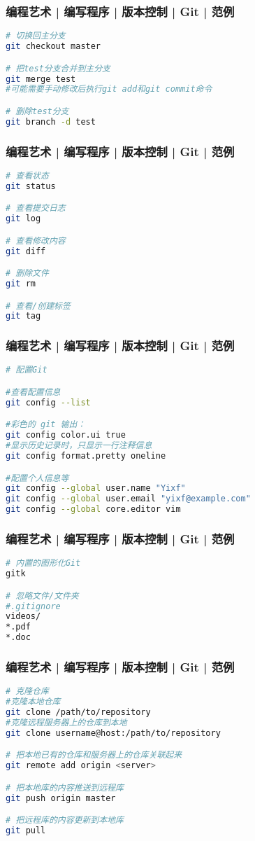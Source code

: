 \begin{frame}[fragile]
  \frametitle{编程艺术 | 编写程序 | 版本控制 | Git | 范例}
\begin{lstlisting}[language=sh]
# 切换回主分支
git checkout master

# 把test分支合并到主分支
git merge test
#可能需要手动修改后执行git add和git commit命令

# 删除test分支
git branch -d test
\end{lstlisting}
\end{frame}

\begin{frame}[fragile]
  \frametitle{编程艺术 | 编写程序 | 版本控制 | Git | 范例}
\begin{lstlisting}[language=sh]
# 查看状态
git status

# 查看提交日志
git log

# 查看修改内容
git diff

# 删除文件
git rm

# 查看/创建标签
git tag
\end{lstlisting}
\end{frame}

\begin{frame}[fragile]
  \frametitle{编程艺术 | 编写程序 | 版本控制 | Git | 范例}
\begin{lstlisting}[language=sh]
# 配置Git

#查看配置信息
git config --list

#彩色的 git 输出：
git config color.ui true
#显示历史记录时，只显示一行注释信息
git config format.pretty oneline

#配置个人信息等
git config --global user.name "Yixf"
git config --global user.email "yixf@example.com"
git config --global core.editor vim
\end{lstlisting}
\end{frame}

\begin{frame}[fragile]
  \frametitle{编程艺术 | 编写程序 | 版本控制 | Git | 范例}
\begin{lstlisting}[language=sh]
# 内置的图形化Git
gitk

# 忽略文件/文件夹
#.gitignore
videos/
*.pdf
*.doc
\end{lstlisting}
\end{frame}

\begin{frame}[fragile]
  \frametitle{编程艺术 | 编写程序 | 版本控制 | Git | 范例}
\begin{lstlisting}[language=sh]
# 克隆仓库
#克隆本地仓库
git clone /path/to/repository
#克隆远程服务器上的仓库到本地
git clone username@host:/path/to/repository

# 把本地已有的仓库和服务器上的仓库关联起来
git remote add origin <server>

# 把本地库的内容推送到远程库
git push origin master

# 把远程库的内容更新到本地库
git pull
\end{lstlisting}
\end{frame}

